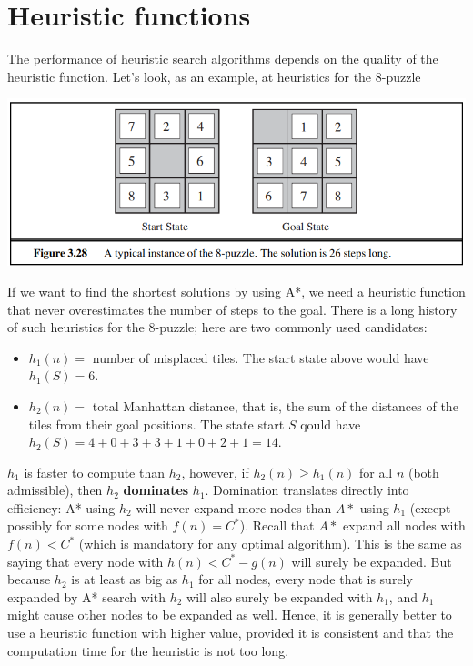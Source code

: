 \section{Heuristic functions}
The performance of heuristic search algorithms depends on the quality of the heuristic function. Let's look, as an example, at heuristics for the 8-puzzle
\begin{center}
    \includegraphics[]{images/8-puzzle.png}
\end{center}
If we want to find the shortest solutions by using A*, we need a heuristic function that never overestimates the number of steps to the goal. There is a long history of such heuristics for the 8-puzzle; here are two commonly used candidates:
\begin{itemize}
    \item $h_1(n) =$ number of misplaced tiles. The start state above would have $h_1(S) = 6$.
    \item $h_2(n) =$ total Manhattan distance, that is, the sum of the distances of the tiles from their goal positions. The state start $S$ qould have $h_2(S) = 4 + 0 + 3 + 3 + 1 + 0 + 2 + 1 = 14$.
\end{itemize}
$h_1$ is faster to compute than $h_2$, however, if $h_2(n) \geq h_1(n)$ for all $n$ (both admissible), then $h_2$ \textbf{dominates} $h_1$. Domination translates directly into efficiency: A* using
$h_2$ will never expand more nodes than $A*$ using $h_1$ (except possibly for some nodes with $f(n) = C^*$). Recall that $A*$ expand all nodes with $f(n) < C^*$ (which is mandatory for any optimal algorithm). This is the same as saying that every node with $h(n) < C^* - g(n)$ will surely be expanded. But because $h_2$ is at least as big as $h_1$ for all nodes, every node that is surely expanded by A* search with $h_2$ will also surely be expanded with $h_1$, and $h_1$ might cause other nodes to be expanded as well. Hence, it is generally better to use a heuristic function with higher value, provided it is consistent and that the computation time for the heuristic is not too long.\newline\newline
